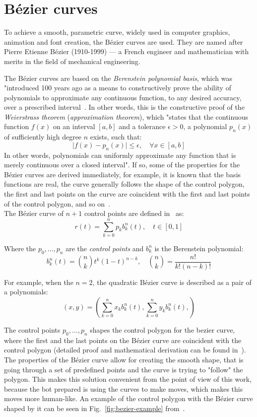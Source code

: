\section{Bézier curves}\label{sec:bezier-curves}
To achieve a smooth, parametric curve, widely used in computer graphics, animation and font creation, the Bézier curves are used.
They are named after Pierre Etienne Bézier (1910-1999) --- a French engineer and mathematician with merits in the field of mechanical engineering.

The Bézier curves are based on the \textit{Berenstein polynomial basis}, which was "introduced 100 years ago as a means to constructively prove the ability of polynomials to approximate any continuous function, to any desired accuracy, over a prescribed interval~\cite{farouki2012bernstein}.
In other words, this is the constructive proof of the \textit{Weierstrass theorem} (\textit{approximation theorem}), which "states that the continuous function $f(x)$ on an interval $[a, b]$ and a tolerance $\epsilon > 0$, a polynomial $p_n(x)$ of sufficiently high degree $n$ exists, such that:
\[
    \mid f(x) - p_n(x) \mid \leq \epsilon, \quad \forall x \in \left[ a,b \right]
\]
In other words, polynomials can uniformly approximate any function that is merely continuous over a closed interval"\cite{farouki2012bernstein}.
If so, some of the properties for the Bézier curves are derived immediately, for example, it is known that the basis functions are real, the curve generally follows the shape of the control polygon, the first and last points on the curve are coincident with the first and last points of the control polygon, and so on~\cite{bezier-curves}.\\

The Bézier curve of $n+1$ control points are defined in~\cite{farouki2012bernstein} as:
\[
    r(t) = \sum_{k=0}^n p_k b_k^n(t),  \quad t \in [0,1]
\]

Where the $p_0,\dots,p_n$ are the \textit{control points} and $b_k^n$ is the Berenstein polynomial:
\[
    b_k^n(t) = \binom{n}{k} t^k (1-t)^{n-k}, \quad \binom{n}{k} = \frac{n!}{k!(n-k)!}
\]

For example, when the $n = 2$, the quadratic Bézier curve is described as a pair of a polynomials:
\[
    (x,y) = \left( \sum_{k=0}^n x_{k} b_k^n(t), \sum_{k=0}^n y_{k} b_k^n(t), \right)
\]

The control points $p_0,\dots,p_n$ shapes the control polygon for the bezier curve, where the first and the last points on the Bézier curve are coincident with the control polygon (detailed proof and mathematical derivation can be found in~\cite{farouki2012bernstein}).
The properties of the Bézier curve allow for creating the smooth shape, that is going through a set of predefined points and the curve is trying to "follow" the polygon.
This makes this solution convenient from the point of view of this work, because the bot prepared is using the curves to make moves, which makes this moves more human-like.
An example of the control polygon with the Bézier curve shaped by it can be seen in Fig.~\ref{fig:bezier-example} from~\cite{farouki2012bernstein}.

